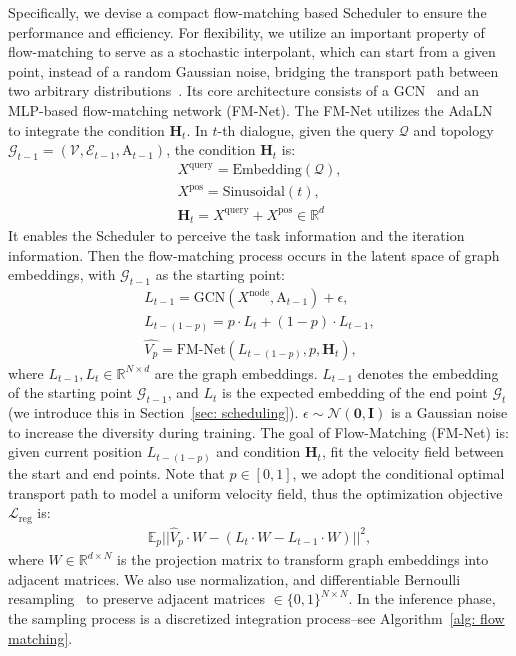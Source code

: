 Specifically, we devise a compact flow-matching based Scheduler to ensure the  performance and  efficiency. For  flexibility, we utilize an important property of flow-matching to serve as a stochastic interpolant, which can start from a given point, instead of a random Gaussian noise, bridging the transport path between two arbitrary distributions~\citep{wu2026aurora}.  Its core architecture consists of a GCN~\citep{zhang2019graph} and an MLP-based flow-matching network (FM-Net). The FM-Net utilizes the AdaLN~\citep{peebles2023scalable} to integrate the condition $\mathbf{H}_t$. In $t$-th dialogue, given the query $\mathcal{Q}$ and topology $\mathcal{G}_{t-1}=(\mathcal{V}, \mathcal{E}_{t-1}, \mathrm{A}_{t-1})$, the condition $\mathbf{H}_t$ is:
\begin{gather}
X^{\text{query}} = \text{Embedding}
(\mathcal{Q}),\\
X^{\text{pos}} = \text{Sinusoidal}(t), \\
\mathbf{H}_t = X^{\text{query}} + X^{\text{pos}} \in \mathbb{R}^{d}
\end{gather}
It enables the Scheduler to perceive the task information and the iteration information. Then the flow-matching process occurs in the latent space of graph embeddings, with $\mathcal{G}_{t-1}$ as the starting point:
\begin{gather}
    L_{t-1} = \text{GCN}(X^{\text{node}}, \mathrm{A}_{t-1}) + \epsilon,\\
    L_{t-(1 - p)} = p\cdot L_t + (1-p)\cdot L_{t-1},\\
    \hat{V_p} = \text{FM-Net}(L_{t-(1-p)},p,\mathbf{H}_t),
\end{gather}
where $L_{t-1}, L_{t} \in \mathbb{R}^{N\times d}$ are the graph embeddings. $L_{t-1}$ denotes the embedding of the starting point $\mathcal{G}_{t-1}$, and $L_t$ is the expected embedding of the end point $\mathcal{G}_{t}$ (we introduce this in Section~\ref{sec: scheduling}). $\epsilon \sim \mathcal{N}(\mathbf{0},\mathbf{I})$ is a Gaussian noise to increase the diversity during training. The goal of Flow-Matching (FM-Net) is: given current position $L_{t-(1-p)}$ and condition $\mathbf{H}_t$, fit the velocity field between the start and end points. Note that $p \in [0,1]$, we adopt the conditional optimal transport path to model a uniform velocity field, thus the optimization objective $\mathcal{L}_{\text{reg}}$ is:
\begin{gather}
    \mathbb{E}_{p}|| \hat{V}_p\cdot W - (L_t \cdot W - L_{t-1}\cdot W) ||^2,\label{eq: 14}
\end{gather}
where $W \in \mathbb{R}^{d\times N}$ is the projection matrix to transform graph embeddings into adjacent matrices. We also use normalization, and differentiable Bernoulli
resampling~\citep{jang2016categorical} to preserve adjacent matrices $\in\{0,1\}^{N\times N}$. In the inference phase, the sampling process is a discretized integration process--see Algorithm~\ref{alg: flow matching}.


